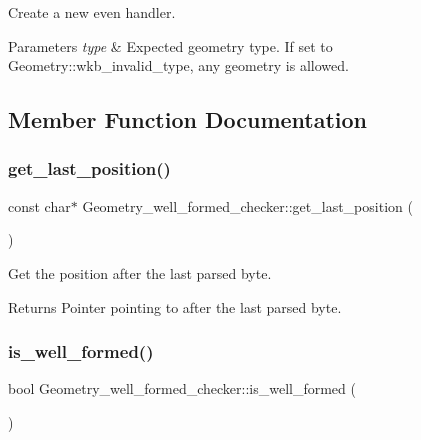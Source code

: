 Create a new even handler.


\begin{DoxyParams}{Parameters}
{\em type} & Expected geometry type. If set to Geometry\+::wkb\+\_\+invalid\+\_\+type, any geometry is allowed. \\
\hline
\end{DoxyParams}


\subsection{Member Function Documentation}
\mbox{\label{classGeometry__well__formed__checker_a16c82c0056e2db30c8305fe3d433d48f}} 
\subsubsection{\texorpdfstring{get\+\_\+last\+\_\+position()}{get\_last\_position()}}
{\footnotesize\ttfamily const char$\ast$ Geometry\+\_\+well\+\_\+formed\+\_\+checker\+::get\+\_\+last\+\_\+position (\begin{DoxyParamCaption}{ }\end{DoxyParamCaption})\hspace{0.3cm}{\ttfamily [inline]}}

Get the position after the last parsed byte.

\begin{DoxyReturn}{Returns}
Pointer pointing to after the last parsed byte. 
\end{DoxyReturn}
\mbox{\label{classGeometry__well__formed__checker_aba31509fe61d86bb0caa954fdacad0e6}} 
\subsubsection{\texorpdfstring{is\+\_\+well\+\_\+formed()}{is\_well\_formed()}}
{\footnotesize\ttfamily bool Geometry\+\_\+well\+\_\+formed\+\_\+checker\+::is\+\_\+well\+\_\+formed (\begin{DoxyParamCaption}{ }\end{DoxyParamCaption})\hspace{0.3cm}{\ttfamily [inline]}}


